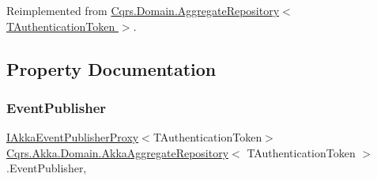 Reimplemented from \hyperlink{classCqrs_1_1Domain_1_1AggregateRepository_a3191ba3d6fa4f6b904128c4731262944}{Cqrs.\+Domain.\+Aggregate\+Repository$<$ T\+Authentication\+Token $>$}.



\subsection{Property Documentation}
\mbox{\label{classCqrs_1_1Akka_1_1Domain_1_1AkkaAggregateRepository_a6c6400aef33fd3ec5dc3e479ebec6b40}} 
\subsubsection{\texorpdfstring{Event\+Publisher}{EventPublisher}}
{\footnotesize\ttfamily \hyperlink{interfaceCqrs_1_1Akka_1_1Events_1_1IAkkaEventPublisherProxy}{I\+Akka\+Event\+Publisher\+Proxy}$<$T\+Authentication\+Token$>$ \hyperlink{classCqrs_1_1Akka_1_1Domain_1_1AkkaAggregateRepository}{Cqrs.\+Akka.\+Domain.\+Akka\+Aggregate\+Repository}$<$ T\+Authentication\+Token $>$.Event\+Publisher\hspace{0.3cm}{\ttfamily [get]}, {\ttfamily [protected]}}

